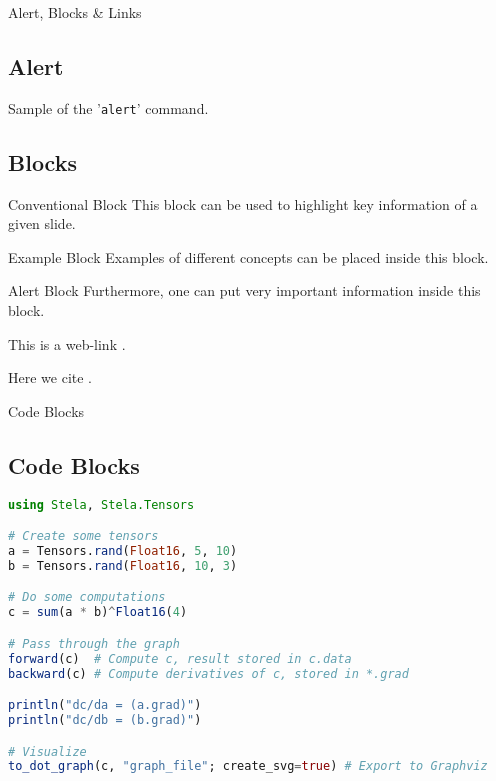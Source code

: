 \documentclass[8pt, handout, aspectratio = 1510]{beamer}
\begin{document}
	\begin{frame}{Alert, Blocks \& Links}
		\subsection{Alert}
		\alert{Sample of the '\texttt{alert}' command.}

		\vspace{5mm}
		\subsection{Blocks}
		\begin{block}{Conventional Block}
			This block can be used to highlight key information of a given slide.
		\end{block}

		\begin{exampleblock}{Example Block}
			Examples of different concepts can be placed inside this block.
		\end{exampleblock}

		\begin{alertblock}{Alert Block}
			Furthermore, one can put very important information inside this block.
		\end{alertblock}

		\vspace*{5mm}
		This is a web-link .

		\vspace*{5mm}
		Here we cite \cite{Anand:2020aa}.
	\end{frame}

	\begin{frame}[fragile]{Code Blocks}
		\subsection{Code Blocks}

		\begin{lstlisting}[language = julia, caption = {Some random code}]
using Stela, Stela.Tensors

# Create some tensors
a = Tensors.rand(Float16, 5, 10)
b = Tensors.rand(Float16, 10, 3)

# Do some computations
c = sum(a * b)^Float16(4)

# Pass through the graph
forward(c)  # Compute c, result stored in c.data
backward(c) # Compute derivatives of c, stored in *.grad

println("dc/da = (a.grad)")
println("dc/db = (b.grad)")

# Visualize
to_dot_graph(c, "graph_file"; create_svg=true) # Export to Graphviz
		\end{lstlisting}

	\end{frame}
\end{document}
